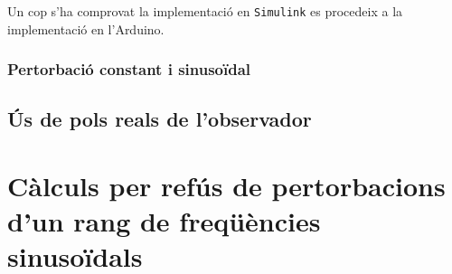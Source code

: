 \documentclass[12pt,a4paper,final,twoside,openright]{report}
\begin{document}
Un cop s'ha comprovat la implementació en \texttt{Simulink} es procedeix a la implementació en l'Arduino. 

\subsection{Pertorbació constant i sinusoïdal}

\section{Ús de pols reals de l'observador}

%


\appendix
\clearpage %
\addappheadtotoc
\appendixpage

\chapter{Càlculs per refús de pertorbacions d'un rang de freqüències sinusoïdals}
\end{document}
